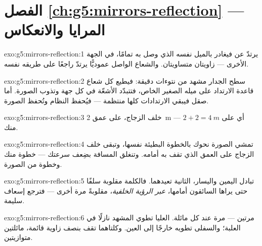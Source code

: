 \section*{الفصل \ref{ch:g5:mirrors-reflection} --- المرايا والانعكاس}

\begin{solution}{exo:g5:mirrors-reflection:1}
يرتدّ  عن  فيغادر بالميل نفسه الذي وصل به تمامًا، في
الجهة الأخرى --- زاويتان متساويتان. والشعاع الواصل عموديًّا
يرتدّ راجعًا على طريقه نفسه.
\end{solution}

\begin{solution}{exo:g5:mirrors-reflection:2}
سطح الجدار مشهد من نتوءات دقيقة: فيطيع كل شعاع قاعدة الارتداد
على ميله الصغير الخاص، فتتبدّد الأشعّة في كل جهة وتذوب الصورة.
أما صقل  فيبقي الارتدادات كلها منتظمة --- فيُحفظ النظام
وتُحفظ الصورة.
\end{solution}

\begin{solution}{exo:g5:mirrors-reflection:3}
خلف الزجاج، على عمق \qty{2}{m} --- أي على $2 + 2 = \qty{4}{m}$
منك.
\end{solution}

\begin{solution}{exo:g5:mirrors-reflection:4}
تمشي الصورة نحوك بالخطوة البطيئة نفسها، وتبقى خلف الزجاج على
العمق الذي تقف به أمامه. وتنغلق المسافة بضِعف سرعتك --- خطوة
منك وخطوة من الصورة.
\end{solution}

\begin{solution}{exo:g5:mirrors-reflection:5}
 تبادل اليمين واليسار،  الثانية تعيدهما. فالكلمة
مقلوبة سلفًا حتى يراها السائقون أمامها، \emph{عبر  الرؤية
الخلفية}، مقلوبةً مرة أخرى --- فترجع إسعاف سليمة.
\end{solution}

\begin{solution}{exo:g5:mirrors-reflection:6}
مرتين --- مرة عند كل  مائلة.  العليا تطوي  المشهد
نازلًا في العلبة؛ والسفلى تطويه خارجًا إلى العين. وكلتاهما تقف
بنصف زاوية قائمة، مائلتين متوازيتين.
\end{solution}

